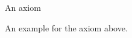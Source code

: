 \documentclass[minimal]{omdoc}
\begin{document}
\begin{module}[id=foo]
    \begin{axiom}[id=ax.one,title=A title]
      An axiom
    \end{axiom}

  \begin{example}[for=ax.one,title=A title]
    An example for the axiom above.
  \end{example}
\end{module}
\end{document}
